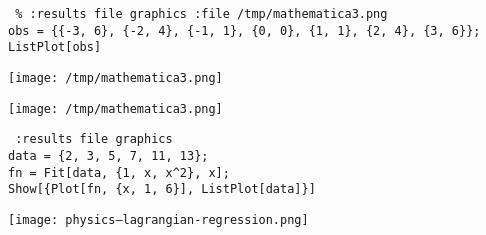 



\begin{verbatim} % :results file graphics :file /tmp/mathematica3.png
obs = {{-3, 6}, {-2, 4}, {-1, 1}, {0, 0}, {1, 1}, {2, 4}, {3, 6}};
ListPlot[obs]
\end{verbatim}

\texttt{[image: /tmp/mathematica3.png]}


\texttt{[image: /tmp/mathematica3.png]}




\begin{verbatim} :results file graphics
data = {2, 3, 5, 7, 11, 13};
fn = Fit[data, {1, x, x^2}, x];
Show[{Plot[fn, {x, 1, 6}], ListPlot[data]}]
\end{verbatim}

\texttt{[image: physics--lagrangian-regression.png]}


